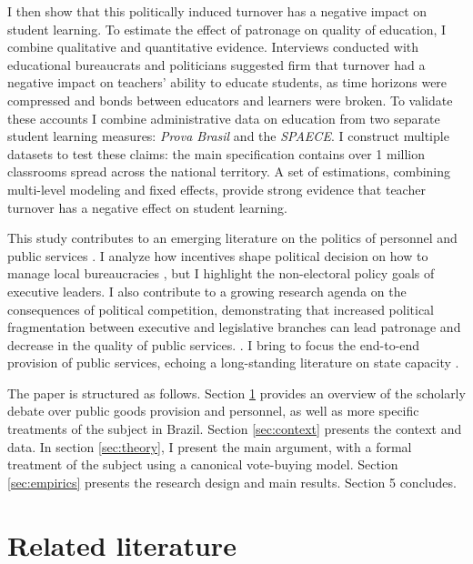 I then show that this politically induced turnover has a negative impact on student learning. To estimate the effect of patronage on quality of education, I combine qualitative and quantitative evidence. Interviews conducted with educational bureaucrats and politicians suggested firm that turnover had a negative impact on teachers' ability to educate students, as time horizons were compressed and bonds between educators and learners were broken. To validate these accounts I combine administrative data on education from two separate student learning measures: \emph{Prova Brasil} and the \emph{SPAECE}. I construct multiple datasets to test these claims: the main specification contains over 1 million classrooms spread across the national territory. A set of estimations, combining multi-level modeling and fixed effects, provide strong evidence that teacher turnover has a negative effect on student learning.

This study contributes to an emerging literature on the politics of personnel and public services \citep{pepinsky_bureaucracy_2017, finan_personnel_2015}. I analyze how incentives shape political decision on how to manage local bureaucracies \citep{duflo_incentives_2012, gulzar_politicians_2017}, but I highlight the non-electoral policy goals of executive leaders. I also contribute to a growing research agenda on the consequences of political competition, demonstrating that increased political fragmentation between executive and legislative branches can lead patronage and decrease in the quality of public services. \citep{gottlieb_countervailing_2019, ferraz_corrupting_2012}. I bring to focus the end-to-end provision of public services, echoing a long-standing literature on state capacity \citep{kohli_state-directed_2004, evans_embedded_1995}.

The paper is structured as follows. Section \ref{sec:literature} provides an overview of the scholarly debate over public goods provision and personnel, as well as more specific treatments of the subject in Brazil. Section \ref{sec:context} presents the context and data. In section \ref{sec:theory}, I present the main argument, with a formal treatment of the subject using a canonical vote-buying model. Section \ref{sec:empirics} presents the research design and main results. Section 5 concludes.

\section{Related literature}
\label{sec:literature}

